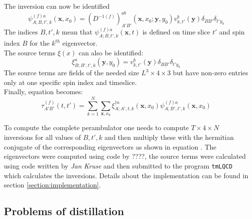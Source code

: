     The inversion  can now be identified
    \begin{equation}
        \psi^{(f)a}_{A;B,t',k}(\textbf{x},x_0) = (D^{-1(f)})^{ab}_{A'B'}(\textbf{x},x_0;\textbf{y},y_0)
            v_{k,t'}^{b}(\textbf{y})\delta_{BB'}\delta_{t'y_0}
    \end{equation}
    The indices $B,t',k$ mean that $\psi^{(f)a}_{A;B,t',k}(\textbf{x},t)$ is defined on time slice $t'$ and spin index $B$ for the $k^{th}$ eigenvector.\\
    
    The source terms $\xi(x)$ can also be identified:
    \begin{equation}
        \xi^a_{B;B',t',k}(\textbf{y},y_0) =  v_{k,t'}^{b}(\textbf{y})\delta_{BB'}\delta_{t'y_0}
    \end{equation}
    The source terms are fields of the needed size $L^3 \times 4 \times 3$ but have non-zero entries only at one specific spin index and timeslice.\\
    
    Finally, equation  becomes:
    \begin{equation}\label{perambulator_with_inversion}
        \tau^{(f)}_{A'B'}(t,t') = \sum_{k=1}^N \sum_{\textbf{x},x_0} \xi^{\dagger a}_{A;A',t,k}(\textbf{x},x_0) \psi^{(f)a}_{A;B',t',k}(\textbf{x},x_0) 
    \end{equation}
    
    To compute the complete perambulator one needs to compute $T \times 4 \times N$ inversions for all values of $B,t',k$ and then multiply these with the hermitian conjugate of the corresponding eigenvectors as shown in equation . The eigenvectors were computed using code by ????, the source terms were calculated using code written by \textit{Jan Kruse} \cite{bachelor_thesis_jan} and then submitted to the program \verb+tmLQCD+ \cite{jansen_urbach_2009} which calculates the inversions. Details about the implementation can be found in section \ref{section:implementation}.
    
\subsection{Problems of distillation}
